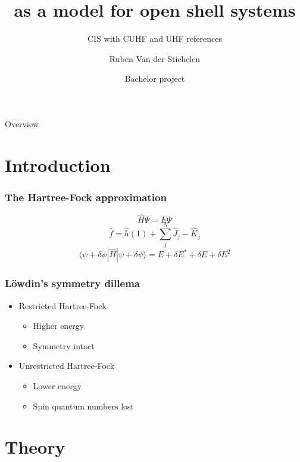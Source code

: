 \documentclass[aspectratio=169]{beamer}
\title{\ce{H3} as a model for open shell systems}
\subtitle{CIS with CUHF and UHF references}
\date[ISBT 2018]{Bachelor project}
\author[DB]{Ruben Van der Stichelen}
\begin{document}
\logoframe

\titleframe

\begin{frame}{Overview}
    \tableofcontents[hideallsubsections]
\end{frame}

\section{Introduction}

\begin{frame}
    \frametitle{The Hartree-Fock approximation}
    \begin{equation}
        \hat{H}\Psi = E\Psi
    \end{equation}
    \begin{equation}
        \hat{f} = \hat{h}(1) + \sum_j^N\hat{J}_j - \hat{K}_j
    \end{equation}
    \begin{equation}
        \langle \psi + \delta\psi | \hat{H} | \psi + \delta\psi \rangle = E + \delta E^* + \delta E + \delta E^2
    \end{equation}
\end{frame}

\begin{frame}
    \frametitle{Löwdin's symmetry dillema}
    \begin{itemize}
        \item Restricted Hartree-Fock
        \begin{itemize}
            \item Higher energy
            \item Symmetry intact
        \end{itemize}
        \item Unrestricted Hartree-Fock
        \begin{itemize}
            \item Lower energy
            \item Spin quantum numbers lost
        \end{itemize}
    \end{itemize}

\end{frame}


\section{Theory}
\end{document}
